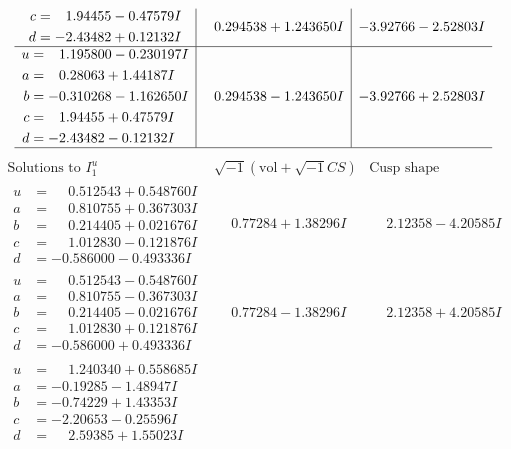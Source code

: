 \documentclass[1p]{elsarticle_modified}
\theoremstyle{definition}
\newcommand{\I}{\sqrt{-1}}
\begin{document}
$$\begin{array}{c|c|c}
\begin{aligned}
c &= \phantom{-}1.94455 - 0.47579 I \\
d &= -2.43482 + 0.12132 I\end{aligned}
 & \phantom{-}0.294538 + 1.243650 I & -3.92766 - 2.52803 I \\ \hline\begin{aligned}
u &= \phantom{-}1.195800 - 0.230197 I \\
a &= \phantom{-}0.28063 + 1.44187 I \\
b &= -0.310268 - 1.162650 I \\
c &= \phantom{-}1.94455 + 0.47579 I \\
d &= -2.43482 - 0.12132 I\end{aligned}
 & \phantom{-}0.294538 - 1.243650 I & -3.92766 + 2.52803 I\\
 \hline 
 \end{array}$$\newpage$$\begin{array}{c|c|c}  
\text{Solutions to }I^u_{1}& \I (\text{vol} + \sqrt{-1}CS) & \text{Cusp shape}\\
 \hline 
\begin{aligned}
u &= \phantom{-}0.512543 + 0.548760 I \\
a &= \phantom{-}0.810755 + 0.367303 I \\
b &= \phantom{-}0.214405 + 0.021676 I \\
c &= \phantom{-}1.012830 - 0.121876 I \\
d &= -0.586000 - 0.493336 I\end{aligned}
 & \phantom{-}0.77284 + 1.38296 I & \phantom{-}2.12358 - 4.20585 I \\ \hline\begin{aligned}
u &= \phantom{-}0.512543 - 0.548760 I \\
a &= \phantom{-}0.810755 - 0.367303 I \\
b &= \phantom{-}0.214405 - 0.021676 I \\
c &= \phantom{-}1.012830 + 0.121876 I \\
d &= -0.586000 + 0.493336 I\end{aligned}
 & \phantom{-}0.77284 - 1.38296 I & \phantom{-}2.12358 + 4.20585 I \\ \hline\begin{aligned}
u &= \phantom{-}1.240340 + 0.558685 I \\
a &= -0.19285 - 1.48947 I \\
b &= -0.74229 + 1.43353 I \\
c &= -2.20653 - 0.25596 I \\
d &= \phantom{-}2.59385 + 1.55023 I\end{aligned}

\end{array}$$
\end{document}
